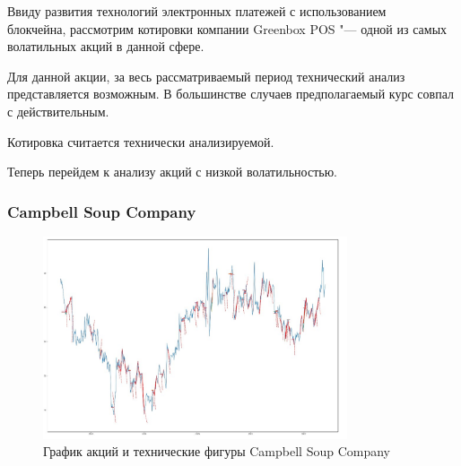 \documentclass[bachelor, och, coursework]{SCWorks}
\begin{document}
    Ввиду развития технологий электронных платежей с использованием \\блокчейна,
    рассмотрим котировки компании Greenbox POS "--- одной из самых волатильных 
    акций в данной сфере.

    Для данной акции, за весь рассматриваемый период технический анализ 
    представляется возможным. В большинстве случаев предполагаемый курс совпал с 
    действительным.
    
    Котировка считается технически анализируемой.

    Теперь перейдем к анализу акций с низкой волатильностью.

    \subsubsection{Campbell Soup Company}
    
    \begin{figure}[H]
        \centering
        \includegraphics[width=0.8\textwidth]{pic/CPB.jpg}
        \caption{График акций и технические фигуры Campbell Soup Company}
    \end{figure}
   
\end{document}
